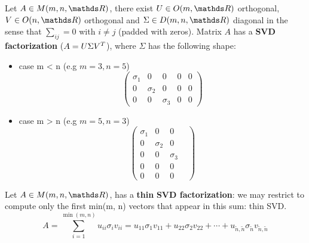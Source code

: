 \documentclass[computationalMathematics.tex]{subfiles}
\begin{document}
\begin{definition}
  Let $A \in M(m, n, \R)$, there exist $U \in O(m, \R)$ orthogonal, $V \in O(n, \R)$ orthogonal and $\Sigma \in D(m, n, \R)$ diagonal in the sense that $\sum_{ij} = 0$ with $i \neq j$ (padded with zeros). 
  Matrix $A$  has a \textbf{SVD factorization} ($A = U \Sigma {V}^{T}$), where $\Sigma$ has the following shape:
  \begin{itemize}
      \item case m < n  (e.g $m=3, n=5$)
        \[
          \begin{pmatrix}
            \sigma_1&0&0&0&0\\
            0& \sigma_2&0&0&0\\
            0&0&\sigma_3&0&0
          \end{pmatrix}
        \]
        
        \item  case m > n (e.g $m=5, n=3$)
        \[
          \begin{pmatrix}
            \sigma_1&0&0&\\
            0& \sigma_2&0&\\
            0&0&\sigma_3&\\
            0&0&0\\
            0&0&0
          \end{pmatrix}
        \]
  \end{itemize}

\end{definition}

\begin{definition}
  Let $A \in M(m, n, \R)$,   has a \textbf{thin} \textbf{SVD factorization}:  we may restrict to compute only the first min(m, n)
vectors that appear in this sum: thin SVD.
  \[
    A = \sum\limits_{i=1}^{\min(m, n)} u_{ii} \sigma_i v_{ii} 
    = u_{11} \sigma_1 v_{11} + u_{22} \sigma_2 v_{22} + \cdots + u_{\tilde{n}, \tilde{n}} \sigma_{\tilde{n}} v_{\tilde{n}, \tilde{n}}
  \]
\end{definition}

\end{document}
